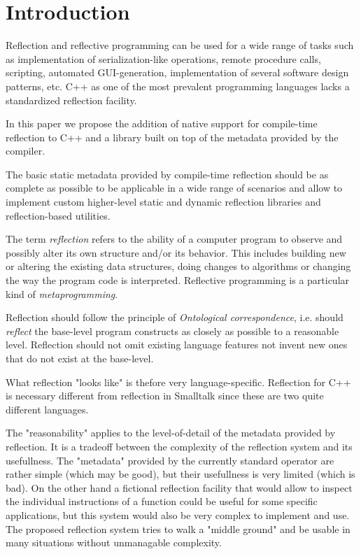 \section{Introduction}

Reflection and reflective programming can be used
for a wide range of tasks such as implementation of serialization-like operations,
remote procedure calls, scripting, automated GUI-generation,
implementation of several software design patterns, etc.
C++ as one of the most prevalent programming languages 
lacks a standardized reflection facility.

In this paper we propose the addition of native support for
compile-time reflection to C++ and a library built
on top of the metadata provided by the compiler.

The basic static metadata provided by compile-time reflection
should be as complete as possible to be applicable in a wide
range of scenarios and allow to implement custom higher-level
static and dynamic reflection libraries and reflection-based
utilities.

The term \emph{reflection} refers to the ability of a computer program
to observe and possibly alter its own structure and/or its behavior.
This includes building new or altering the existing data structures,
doing changes to algorithms or changing the way the program code
is interpreted. Reflective programming is a particular kind
of \emph{metaprogramming}.

Reflection should follow the principle of {\em Ontological correspondence},
i.e. should {\em reflect} the base-level program constructs as closely
as possible to a reasonable level.
Reflection should not omit existing language features not invent new
ones that do not exist at the base-level.

What reflection "looks like" is thefore very language-specific.
Reflection for C++ is necessary different from reflection in Smalltalk
since these are two quite different languages.

The "reasonability" applies to the level-of-detail of the metadata
provided by reflection. It is a tradeoff between the complexity
of the reflection system and its usefullness. The "metadata" provided
by the currently standard \verb@typeid@ operator are rather simple
(which may be good), but their usefullness is very limited (which
is bad). On the other hand a fictional reflection facility that would
allow to inspect the individual instructions of a function could
be useful for some specific applications, but this system would
also be very complex to implement and use.
The proposed reflection system tries to walk a "middle ground"
and be usable in many situations without unmanagable complexity.

